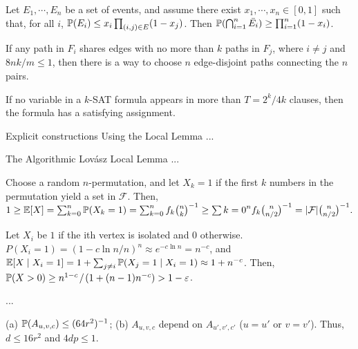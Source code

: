 \documentclass[main.tex]{subfiles}
\begin{document}
\begin{theorem}
    Let $E_1,\cdots,E_n$ be a set of events, and assume there exist $x_1,\cdots,x_n\in[0,1]$ such that, for all $i$, $\mathbb{P}(E_i)\le x_i\prod_{(i,j)\in E}(1-x_j)$. Then $\mathbb{P}(\bigcap_{i=1}^{n}\bar{E_i})\ge\prod_{i=1}^{n}(1-x_i)$.
\end{theorem}

\begin{theorem}
    If any path in $F_i$ shares edges with no more than $k$ paths in $F_j$, where $i\not=j$ and $8nk/m\le 1$, then there is a way to choose $n$ edge-disjoint paths connecting the $n$ pairs.
\end{theorem}

\begin{theorem}
    If no variable in a $k$-SAT formula appears in more than $T=2^k/4k$ clauses, then the formula has a satisfying assignment.
\end{theorem}

\bigskip

{\bs Explicit constructions Using the Local Lemma} ...

{\bs The Algorithmic Lovász Local Lemma} ...

\bigskip

 Choose a random $n$-permutation, and let $X_k = 1$ if the first $k$ numbers in the permutation yield a set in $\mathcal{F}$. Then, $1\ge\mathbb{E}[X]=\sum_{k=0}^{n}\mathbb{P}(X_k=1)=\sum_{k=0}^{n}f_k\binom n k ^{-1}\ge\sum{k=0}^{n}f_k\binom n {n/2}^{-1}=|\mathcal{F}|\binom n {n/2}^{-1}.$

 Let $X_i$ be $1$ if the ith vertex is isolated and $0$ otherwise. $P(X_i=1)=(1-c\ln n/ n)^{n}\approx e^{-c\ln n}=n^{-c}$, and $\mathbb{E}[X\mid X_i=1]=1+\sum_{j\not=i}\mathbb{P}(X_j=1\mid X_i=1)\approx 1+n^{-c}$. Then, $\mathbb{P}(X>0)\ge n^{1-c}\;\!/\;\!(1+(n-1)n^{-c})>1-\varepsilon$.

 ...

 (a) $\mathbb{P}(A_{u,v,c})\le (64r^2)^{-1}$; (b) $A_{u,v,c}$ depend on $A_{u',v',c'}$ ($u = u'$ or $v = v'$). Thus, $d\le 16r^2$ and $4dp\le 1$.
\end{document}
